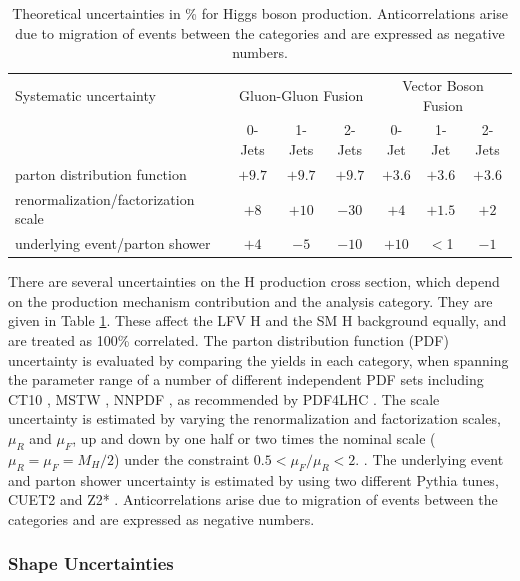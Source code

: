 \documentclass[oneside, letterpaper, oldfontcommands]{memoir}
\begin{document}
\begin{table}[hbtp]
 \centering
  \caption{Theoretical uncertainties in \% for Higgs boson production. Anticorrelations arise due to  migration of events between the categories and are expressed as negative numbers. }
  \label{tab:theory_systematics}
  \begin{tabular}{lccc|ccc} \hline
Systematic uncertainty                  &  \multicolumn{3}{c|}{Gluon-Gluon Fusion} &  \multicolumn{3}{c}{Vector Boson Fusion}  \\ \cline{2-7}
                                &    0-Jets  & 1-Jets  & 2-Jets   & 0-Jet & 1-Jet  & 2-Jets  \\ \hline
parton distribution function         &    $+9.7$  &  $+9.7$ &   $+9.7$ & $+3.6$  &   $+3.6$  &  $+3.6$  \\
renormalization/factorization scale           &    $+8$    &  $+10$   &  $-30$   & $+4$     &   $+1.5$  & $+2$   \\
underlying event/parton shower  &   $+4$     & $-5$   &  $-10$   & $+10$    &   $<$1    & $-1$   \\ \hline
  \end{tabular}

\end{table}


\qquad There are several uncertainties on the H production cross section, which depend on the production mechanism contribution and the analysis category. They are given in Table \ref{tab:theory_systematics}. These affect the LFV H and the SM H background equally, and are treated as 100\% correlated. The parton distribution function (PDF) uncertainty is evaluated by comparing the yields in each category, when spanning the parameter range of a number of different independent PDF sets including CT10 \cite{Nadolsky:2008zw}, MSTW \cite{Martin:2009iq}, NNPDF \cite{Ball:2010de}, as recommended by PDF4LHC \cite{Alekhin:2011sk}. The scale uncertainty is estimated by varying the renormalization and factorization scales, $\mu_{R}$ and $\mu_{F}$, up and down by one half or two times the nominal scale ($\mu_{R} = \mu_{F} = M_{H}/2$) under the constraint $0.5 < \mu_{F}/\mu_{R} < 2$. \cite{Dittmaier:2011ti}. The underlying event and parton shower uncertainty is estimated by using two different {\sc Pythia} tunes, CUET2\cite{Khachatryan:2015pea} and Z2* \cite{Field:2012jv}. Anticorrelations arise due to migration of events between the categories and are expressed as negative numbers.
 
\subsubsection{Shape Uncertainties}
\end{document}
